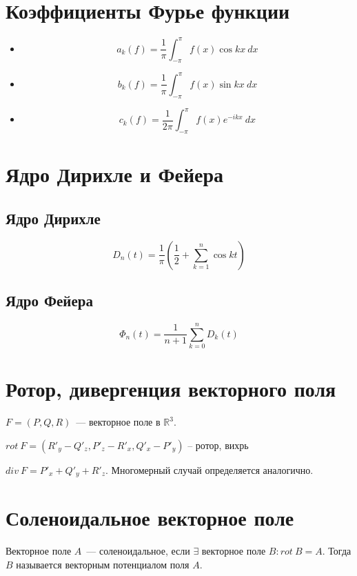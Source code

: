 \documentclass[paper=a4, fontsize=17pt]{article}
\begin{document}
	\section{Коэффициенты Фурье функции}

	\begin{itemize}
		\item $$ a_k(f) = \frac{1}{\pi} \int_{-\pi}^{\pi} f(x) \cos kx ~ dx $$

		\item $$ b_k(f) = \frac{1}{\pi} \int_{-\pi}^{\pi} f(x) \sin kx ~ dx $$

		\item $$ c_k(f) = \frac{1}{2\pi} \int_{-\pi}^{\pi} f(x) e^{-ikx} ~ dx $$

	\end{itemize}

	\section{Ядро Дирихле и Фейера}

	\subsection{Ядро Дирихле}

	$$ D_n(t) = \frac{1}{\pi}( \frac{1}{2} + \sum_{k = 1}^{n} \cos kt) $$

	\subsection{Ядро Фейера}

	$$ \Phi_n(t) = \frac{1}{n+1} \sum_{k = 0}^{n} D_k(t) $$

	\section{Ротор, дивергенция векторного поля}
    $F = (P, Q, R)$~--- векторное поле в $\mathds{R}^3$.

	$ rot\ F = (R'_y - Q'_z, P'_z - R'_x, Q'_x - P'_y) $ -- ротор, вихрь

	$div\ F = P'_x + Q'_y + R'_z$. Многомерный случай определяется аналогично.

	\section{Соленоидальное векторное поле}
	Векторное поле $A$~--- соленоидальное, если $\exists$ векторное поле $B: rot\ B = A$. Тогда $B$ называется векторным потенциалом поля $A$.
\end{document}
